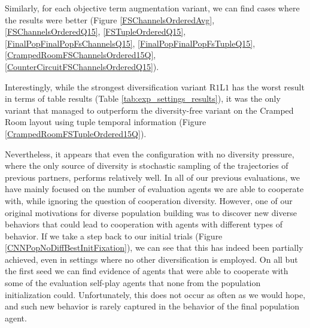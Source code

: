 Similarly, for each objective term augmentation variant, we can find cases where the results were better (Figure \ref{FSChannelsOrderedAvg}, \ref{FSChannelsOrderedQ15}, \ref{FSTupleOrderedQ15}, \ref{FinalPopFinalPopFsChannelsQ15}, \ref{FinalPopFinalPopFsTupleQ15}, \ref{CrampedRoomFSChannelsOrdered15Q}, \ref{CounterCircuitFSChannelsOrderedQ15}).

Interestingly, while the strongest diversification variant R$1$L$1$ has the worst result in terms of table results (Table \ref{tab:exp_settings_results}), it was the only variant that managed to outperform the diversity-free variant on the Cramped Room layout using tuple temporal information (Figure \ref{CrampedRoomFSTupleOrdered15Q}).


Nevertheless, it appears that even the configuration with no diversity pressure, where the only source of diversity is stochastic sampling of the trajectories of previous partners, performs relatively well.
In all of our previous evaluations, we have mainly focused on the number of evaluation agents we are able to cooperate with, while ignoring the question of cooperation diversity.
However, one of our original motivations for diverse population building was to discover new diverse behaviors that could lead to cooperation with agents with different types of behavior.
If we take a step back to our initial trials (Figure \ref{CNNPopNoDiffBestInitFixation}), we can see that this has indeed been partially achieved, even in settings where no other diversification is employed.
On all but the first seed we can find evidence of agents that were able to cooperate with some of the evaluation self-play agents that none from the population initialization could.
Unfortunately, this does not occur as often as we would hope, and such new behavior is rarely captured in the behavior of the final population agent.  